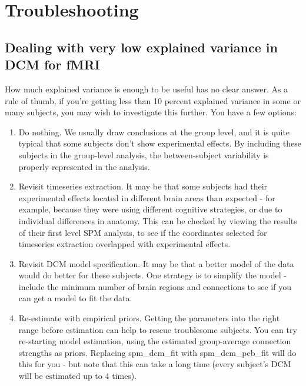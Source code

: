 \documentclass{article}
\begin{document}
\section{Troubleshooting} \label{troubleshooting}

\subsection{Dealing with very low explained variance in DCM for fMRI}

How much explained variance is enough to be useful has no clear answer. As a rule of thumb, if you're getting less than 10 percent explained variance in some or many subjects, you may wish to investigate this further. You have a few options:

\begin{enumerate}
\item Do nothing. We usually draw conclusions at the group level, and it is quite typical that some subjects don't show experimental effects. By including these subjects in the group-level analysis, the between-subject variability is properly represented in the analysis.
\item Revisit timeseries extraction. It may be that some subjects had their experimental effects located in different brain areas than expected - for example, because they were using different cognitive strategies, or due to individual differences in anatomy. This can be checked by viewing the results of their first level SPM analysis, to see if the coordinates  selected for timeseries extraction overlapped with experimental effects. 
\item Revisit DCM model specification. It may be that a better model of the data would do better for these subjects. One strategy is to simplify the model - include the minimum number of brain regions and connections to see if you can get a model to fit the data.
\item Re-estimate with empirical priors. Getting the parameters into the right range before estimation can help to rescue troublesome subjects. You can try re-starting model estimation, using the estimated group-average connection strengths as priors. Replacing spm\_dcm\_fit with spm\_dcm\_peb\_fit will do this for you - but note that this can take a long time (every subject's DCM will be estimated up to 4 times).

\end{enumerate}
\end{document}
